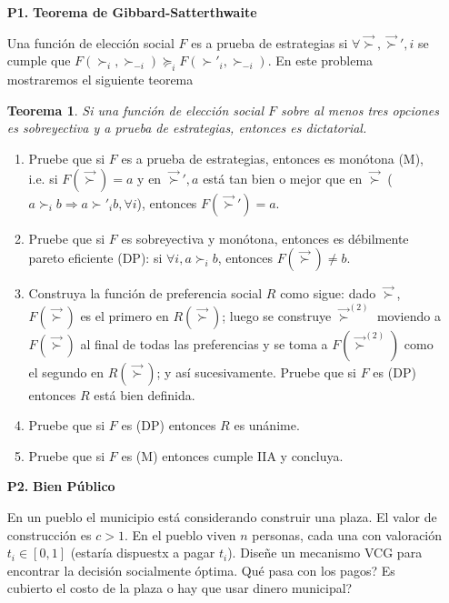 \documentclass[11pt, spanish]{article}
\theoremstyle{plain}
\newtheorem{teo}{Teorema}
\newcommand{\vsucc}[0]{\vec{\succ}}
\begin{document}
\begin{itemize}
\item[\textbf{P1.}] \textbf{Teorema de Gibbard-Satterthwaite}

Una función de elección social $F$ es a prueba de estrategias si $\forall \vsucc, \vsucc', i$ se 
cumple que $F(\succ_i,\succ_{-i}) \succeq_i F(\succ'_i, \succ_{-i})$. En este problema mostraremos el siguiente teorema
\begin{teo}
Si una función de elección social  $F$ sobre al menos tres opciones es sobreyectiva y a prueba de estrategias, entonces es dictatorial.
\end{teo}
\begin{enumerate}
    \item Pruebe que si $F$ es a prueba de estrategias, entonces es monótona (M), i.e. 
    si $F(\vsucc)=a$ y en $\vsucc', a$ está tan bien o mejor que en $\vsucc$
    ($a\succ_i b \Rightarrow a\succ'_i b, \forall i$), entonces
    $F(\vsucc')=a$.
    \item Pruebe que si $F$ es sobreyectiva y monótona, entonces es débilmente pareto
    eficiente (DP): si $\forall i, a\succ_i b$, entonces $F(\vsucc)\neq b$.
    \item Construya la
    función de preferencia social $R$ como sigue: dado $\vsucc$, $F(\vsucc)$ es
    el primero en $R(\vsucc)$; luego se construye $\vsucc^{(2)}$ moviendo a
    $F(\vsucc)$ al final de todas las preferencias y se toma a $F(\vsucc^{(2)})$
    como el segundo en $R(\vsucc)$; y así sucesivamente. Pruebe que si $F$ es (DP) 
    entonces $R$ está bien definida.
    \item Pruebe que si $F$ es (DP) entonces $R$ es unánime.
    \item Pruebe que si $F$ es (M) entonces cumple IIA y concluya.
\end{enumerate}
	
	\item[\textbf{P2.}] \textbf{Bien Público}
	
	En un pueblo el municipio está considerando construir una plaza. El valor
	de construcción es $c>1$. En el pueblo viven $n$ personas, cada una con
	valoración $t_i\in [0,1]$ (estaría dispuestx a pagar $t_i$). Diseñe un
	mecanismo VCG para encontrar la decisión socialmente óptima. Qué pasa
	con los pagos? Es cubierto el costo de la plaza o hay que usar dinero municipal?

\end{itemize}
\end{document}
